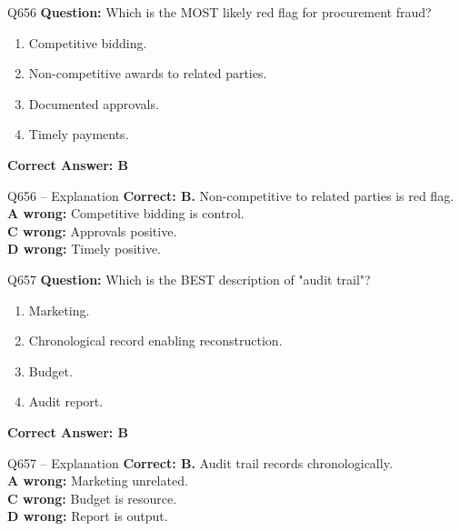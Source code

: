 \documentclass[aspectratio=169,10pt]{beamer}
\begin{document}
	\begin{frame}[t]{Q656}
		\small
		\textbf{Question:} Which is the MOST likely red flag for procurement fraud?
		\begin{enumerate}[label=\Alph*.,itemsep=1pt,topsep=2pt]
			\item Competitive bidding.
			\item Non-competitive awards to related parties.
			\item Documented approvals.
			\item Timely payments.
		\end{enumerate}
		\vspace{4pt}
		\textbf{Correct Answer: B}
	\end{frame}
	
	\begin{frame}[t]{Q656 -- Explanation}
		\small
		\textbf{Correct: B.} Non-competitive to related parties is red flag. \\[4pt]
		\textbf{A wrong:} Competitive bidding is control. \\[2pt]
		\textbf{C wrong:} Approvals positive. \\[2pt]
		\textbf{D wrong:} Timely positive.
	\end{frame}
	
	\begin{frame}[t]{Q657}
		\small
		\textbf{Question:} Which is the BEST description of "audit trail"?
		\begin{enumerate}[label=\Alph*.,itemsep=1pt,topsep=2pt]
			\item Marketing.
			\item Chronological record enabling reconstruction.
			\item Budget.
			\item Audit report.
		\end{enumerate}
		\vspace{4pt}
		\textbf{Correct Answer: B}
	\end{frame}
	
	\begin{frame}[t]{Q657 -- Explanation}
		\small
		\textbf{Correct: B.} Audit trail records chronologically. \\[4pt]
		\textbf{A wrong:} Marketing unrelated. \\[2pt]
		\textbf{C wrong:} Budget is resource. \\[2pt]
		\textbf{D wrong:} Report is output.
	\end{frame}
	
\end{document}
